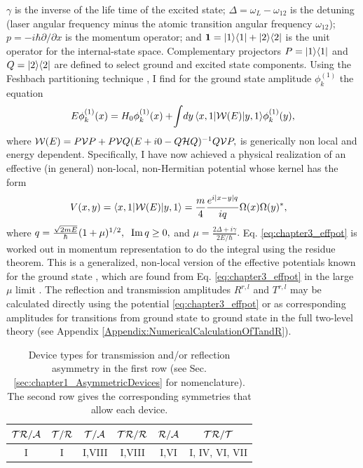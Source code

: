 $\gamma$ is the inverse of the life time of the excited state;
$\Delta=\omega_{L}-\omega_{12}$
is the detuning (laser angular frequency minus the atomic transition
angular frequency $\omega_{12}$);
${p}=-i\hbar\partial/\partial x$ is the momentum operator;
and ${\bf 1}=|1\rangle\langle 1|+|2\rangle\langle 2|$ is the unit operator
for the internal-state space.
Complementary projectors
%
$P=|1\rangle\langle 1|$ and $Q=|2\rangle\langle 2|$
%
are defined to select ground and excited state components.
Using the Feshbach partitioning
technique \cite{Feshbach1958,Feshbach1962,Levine1969},
I find for the ground
state amplitude $\phi_k^{(1)}$ the equation
%
\begin{equation}\label{effecti}
  E\phi_k^{(1)}(x) = H_0\phi_k^{(1)}(x)+\!
  \int\! dy\, \la x,1|{\cal W}(E)|y,1\ra \phi_k^{(1)}(y),
\end{equation}
%
where
%
$
{\cal W}(E)=P{\cal V}P+P{\cal V}Q(E+i0-Q{\cal H}Q)^{-1}Q{\cal V}P,
$
%
is generically non local and energy dependent. Specifically, I have now achieved
a physical realization of an effective (in general) non-local, non-Hermitian potential whose kernel has the form
%
\begin{eqnarray}
  \hspace*{-.3cm}V (x,y) = \la x,1|{\cal W}(E)|y,1\ra = \frac{m}{4} \frac{e^{i|x-y|q}}{i q}
  \Omega(x)\Omega(y)^*,
  \label{eq:chapter3_effpot}
\end{eqnarray}
%
%
where
$
q=\frac{\sqrt{2mE}}{\hbar}(1+\mu)^{1/2},\;\;
{\rm Im}\,q\ge 0,
\label{qeq}
$ and
$
\mu=\frac{2\Delta+i\gamma}{2E/\hbar}.
$
%
Eq. \eqref{eq:chapter3_effpot} is worked out  in momentum representation to do the integral
using the residue theorem.
This is a generalized, non-local version of the effective potentials known for the ground state
\cite{Chudesnikov1991,Oberthaler1996}, which are found from Eq. \eqref{eq:chapter3_effpot}  in the large $\mu$ limit \cite{Ruschhaupt2004a}.
The reflection and transmission amplitudes $R^{r,l}$ and  $T^{r,l}$ may be calculated directly
using the potential \eqref{eq:chapter3_effpot} or as corresponding amplitudes for
transitions from ground state to ground state in the full two-level theory (see Appendix \ref{Appendix:NumericalCalculationOfTandR}).

\begin{table}
  \caption{Device types for  transmission and/or reflection asymmetry in the first row (see Sec. \ref{sec:chapter1_AsymmetricDevices} for nomenclature).
  The second row gives the corresponding symmetries  that allow
  each device.
  \label{devices}}
  \vspace*{.0cm}
  \label{tab:chapter3_table2PhysicalImplementation}
  \centering
  \begin{tabular}{cccccc}
    \hline\hline
    $\cal{TR/A}$ & $\cal{T/R}$ & $\cal{T/A}$ & $\cal{TR/R}$ & $\cal{R/A}$ & $\cal{TR/T}$ \\
    \hline
    I            & I           & I,VIII      & I,VIII       & I,VI        & I, IV, VI, VII
    \\
    \hline\hline
  \end{tabular}
\end{table}
%

